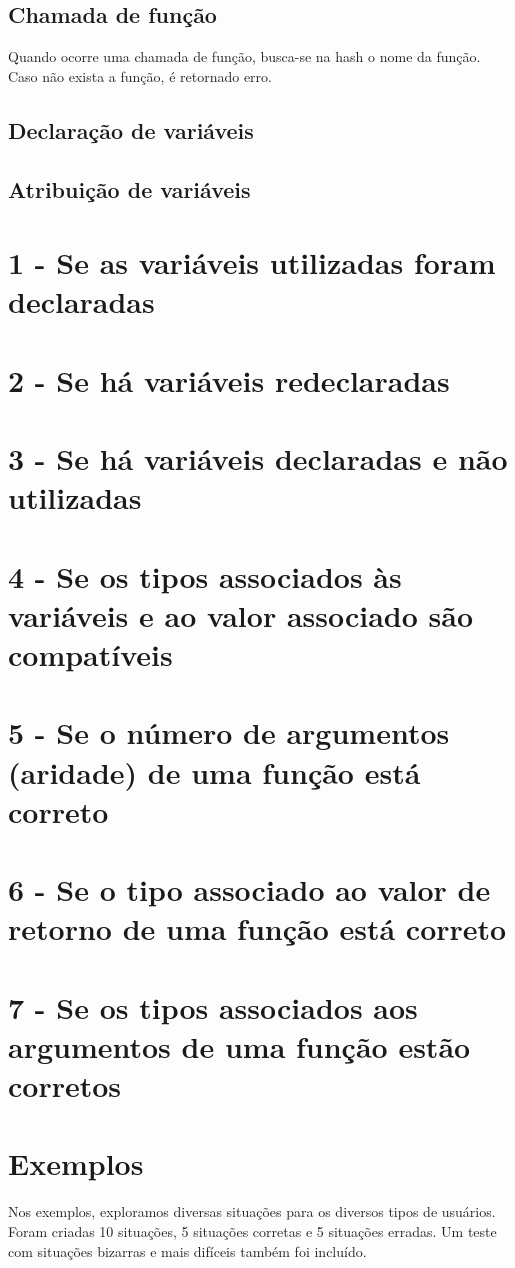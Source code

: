 \documentclass[a4paper,10pt]{article}
\begin{document}
\subsection{Chamada de função}
Quando ocorre uma chamada de função, busca-se na hash o nome da função. Caso não exista a função, é retornado erro.
\subsection{Declaração de variáveis}
\subsection{Atribuição de variáveis}


\section{1 - Se as variáveis utilizadas foram declaradas}
\section{2 - Se há variáveis redeclaradas}
\section{3 - Se há variáveis declaradas e não utilizadas}
\section{4 - Se os tipos associados às variáveis e ao valor associado são compatíveis}
\section{5 - Se o número de argumentos (aridade) de uma função está correto}
\section{6 - Se o tipo associado ao valor de retorno de uma função está correto}
\section{7 - Se os tipos associados aos argumentos de uma função estão corretos}

\section{Exemplos}
Nos exemplos, exploramos diversas situações para os diversos tipos de usuários. Foram criadas 10 situações, 5 situações corretas e 5 
situações erradas. Um teste com situações bizarras e mais difíceis também foi incluído.
\end{document}
